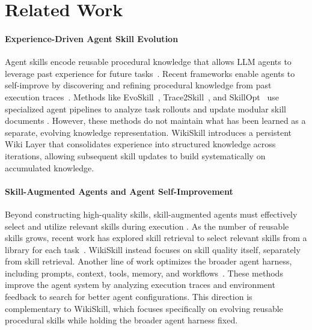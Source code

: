 \documentclass[11pt, a4paper, copyright, gr]{google}
\newcommand{\method}{WikiSkill\xspace}
\begin{document}
\section{Related Work}
\paragraph{Experience-Driven Agent Skill Evolution}

Agent skills encode reusable procedural knowledge that allows LLM agents to leverage past experience for future tasks~\citep{zhang2025equipping, li2026skillsbench,anthropic2026buildingskills, xia2026metaclawjusttalk, zhou2026mementoskillsletagentsdesign, wang2026skillgradoptimizingagentskills, xu2026agentskillslargelanguage}. Recent frameworks enable agents to self-improve by discovering and refining procedural knowledge from past execution traces~\citep{yuksekgonul2025optimizing, agrawal2026gepa,ouyang2026skillos, xia2026skillrlevolvingagentsrecursive, lu2026skill0incontextagenticreinforcement}. Methods like EvoSkill~\citep{alzubi2026evoskill}, Trace2Skill~\citep{ni2026trace2skill}, and SkillOpt~\citep{yang2026skillopt} use specialized agent pipelines to analyze task rollouts and update modular skill documents \citep{zhang2026coevoskillsselfevolvingagentskills}. However, these methods do not maintain what has been learned as a separate, evolving knowledge representation. \method introduces a persistent Wiki Layer that consolidates experience into structured knowledge across iterations, allowing subsequent skill updates to build systematically on accumulated knowledge.


\vspace{-5pt}
\paragraph{Skill-Augmented Agents and Agent Self-Improvement}

Beyond constructing high-quality skills, skill-augmented agents must effectively select and utilize relevant skills during execution \citep{chen2026skillcraftllmagentslearn,liu2026agenticskillsworkwild}. As the number of reusable skills grows, recent work has explored skill retrieval to select relevant skills from a library for each task~\citep{zheng2026skillrouter,su2026skill,cho2026skillret,shi2026skill1,ye2026meta}. \method instead focuses on skill quality itself, separately from skill retrieval. Another line of work optimizes the broader agent harness, including prompts, context, tools, memory, and workflows~\citep{lou2026autoharness,lee2026meta,zhang2026selfharnessharnessesimprove,chen2026harnessx, lin2026agenticharnessengineeringobservabilitydriven}. These methods improve the agent system by analyzing execution traces and environment feedback to search for better agent configurations. This direction is complementary to \method, which focuses specifically on evolving reusable procedural skills while holding the broader agent harness fixed.
\end{document}
